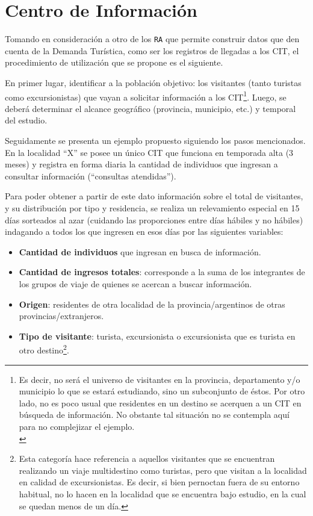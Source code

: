 \documentclass[
]{book}
\begin{document}
\hypertarget{centro-de-informaciuxf3n}{%
\section{Centro de Información}\label{centro-de-informaciuxf3n}}

Tomando en consideración a otro de los \texttt{RA} que permite construir datos que den cuenta de la Demanda Turística, como ser los registros de llegadas a los CIT, el procedimiento de utilización que se propone es el siguiente.

En primer lugar, identificar a la población objetivo: los visitantes (tanto turistas como excursionistas) que vayan a solicitar información a los CIT\footnote{Es decir, no será el universo de visitantes en la provincia, departamento y/o municipio lo que se estará estudiando, sino un subconjunto de éstos. Por otro lado, no es poco usual que residentes en un destino se acerquen a un CIT en búsqueda de información. No obstante tal situación no se contempla aquí para no complejizar el ejemplo.\\
}. Luego, se deberá determinar el alcance geográfico (provincia, municipio, etc.) y temporal del estudio.

Seguidamente se presenta un ejemplo propuesto siguiendo los pasos mencionados. En la localidad ``X'' se posee un único CIT que funciona en temporada alta (3 meses) y registra en forma diaria la cantidad de individuos que ingresan a consultar información (``consultas atendidas'').

Para poder obtener a partir de este dato información sobre el total de visitantes, y su distribución por tipo y residencia, se realiza un relevamiento especial en 15 días sorteados al azar (cuidando las proporciones entre días hábiles y no hábiles) indagando a todos los que ingresen en esos días por las siguientes variables:

\begin{itemize}
\item
  \textbf{Cantidad de individuos} que ingresan en busca de información.
\item
  \textbf{Cantidad de ingresos totales}: corresponde a la suma de los integrantes de los grupos de viaje de quienes se acercan a buscar información.
\item
  \textbf{Origen}: residentes de otra localidad de la provincia/argentinos de otras provincias/extranjeros.
\item
  \textbf{Tipo de visitante}: turista, excursionista o excursionista que es turista en otro destino\footnote{Esta categoría hace referencia a aquellos visitantes que se encuentran realizando un viaje multidestino como turistas, pero que visitan a la localidad en calidad de excursionistas. Es decir, si bien pernoctan fuera de su entorno habitual, no lo hacen en la localidad que se encuentra bajo estudio, en la cual se quedan menos de un día.}.
\end{itemize}
\end{document}
